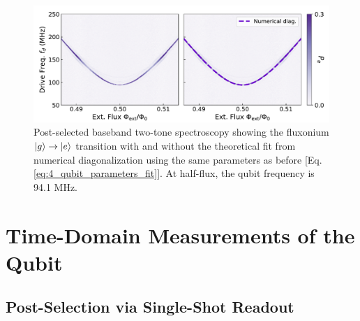 \begin{figure}[h]
    \centering
    \includegraphics[width=0.88\linewidth]{Figures/4/qubit_spectroscopy.pdf}
    \caption[Baseband two-tone spectroscopy showing the fluxonium qubit $\ket{g}\to\ket{e}$ transition.]{Post-selected baseband two-tone spectroscopy showing the fluxonium $\ket{g}\to\ket{e}$ transition with and without the theoretical fit from numerical diagonalization using the same parameters as before [Eq. \eqref{eq:4_qubit_parameters_fit}]. At half-flux, the qubit frequency is 94.1 MHz.}
\label{fig:4_qubit_spectroscopy}
\end{figure}

\section{Time-Domain Measurements of the Qubit \label{sec:4_Time_Domain}}

\subsection{Post-Selection via Single-Shot Readout}

